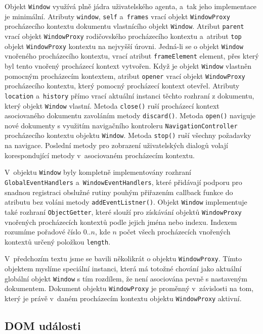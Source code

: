 Objekt \texttt{Window} využívá plně jádra uživatelského agenta, a~tak jeho implementace je minimální. Atributy \texttt{window}, \texttt{self} a~\texttt{frames} vrací objekt \texttt{WindowProxy} procházecího kontextu dokumentu vlastnícího objekt \texttt{Window}. Atribut \texttt{parent} vrací objekt \texttt{WindowProxy} rodičovského procházecího kontextu a~atribut \texttt{top} objekt \texttt{WindowProxy} kontextu na nejvyšší úrovni. Jedná-li se o objekt \texttt{Window} vnořeného procházecího kontextu, vrací atribut \texttt{frameElement} element, přes který byl tento vnořený procházecí kontext vytvořen. Když je objekt \texttt{Window} vlastněn pomocným procházecím kontextem, atribut \texttt{opener} vrací objekt \texttt{WindowProxy} procházecího kontextu, který pomocný procházecí kontext otevřel. Atributy \texttt{location} a~\texttt{history} přímo vrací aktuální instanci těchto rozhraní z dokumentu, který objekt \texttt{Window} vlastní. Metoda \texttt{close()} ruší procházecí kontext asociovaného dokumentu zavoláním metody \texttt{discard()}. Metoda \texttt{open()} naviguje nové dokumenty s využitím navigačního kontroleru \texttt{NavigationController} procházecího kontextu objektu \texttt{Window}. Metoda \texttt{stop()} ruší všechny požadavky na navigace. Poslední metody pro zobrazení uživatelských dialogů volají korespondující metody v~asociovaném procházecím kontextu. 

V~objektu \texttt{Window} byly kompletně implementovány rozhraní \texttt{GlobalEventHandlers} a~\texttt{WindowEventHandlers}, které přidávají podporu pro snadnou registraci obslužné rutiny pouhým přiřazením callback funkce do atributu bez voláni metody \texttt{addEventListner()}. Objekt \texttt{Window} implementuje také rozhraní \texttt{ObjectGetter}, které slouží pro získávání objektů \texttt{WindowProxy} vnořených procházecích kontextů podle jejich jména nebo indexu. Indexem rozumíme pořadové číslo $0..n$, kde $n$ počet všech procházecích vnořených kontextů určený položkou \texttt{length}.

V~předchozím textu jsme se bavili několikrát o objektu \texttt{WindowProxy}. Tímto objektem myslíme speciální instanci, která má totožné chování jako aktuální globální objekt \texttt{Window} s tím rozdílem, že není asociována pevně s nastaveným dokumentem. Dokument objektu \texttt{WindowProxy} je proměnný v~závislosti na tom, který je právě v~daném procházecím kontextu objektu \texttt{WindowProxy} aktivní. 

\subsection{DOM události}
\label{Chapter.Implementation.DOMEvents}

